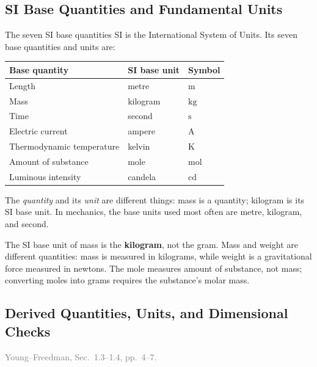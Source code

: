 \documentclass[11pt,letterpaper]{article}
\newcommand{\bookref}[2]{\textcolor{gray}{\footnotesize Young--Freedman, Sec.~#1, pp.~#2.}}
\begin{document}
\subsection{SI Base Quantities and Fundamental Units}
\begin{defbox}{The seven SI base quantities}
SI is the International System of Units. Its seven base quantities and units are:
\begin{center}
\begin{tabular}{lll}
\toprule
\textbf{Base quantity} & \textbf{SI base unit} & \textbf{Symbol}\\
\midrule
Length & metre & $\mathrm{m}$\\
Mass & kilogram & $\mathrm{kg}$\\
Time & second & $\mathrm{s}$\\
Electric current & ampere & $\mathrm{A}$\\
Thermodynamic temperature & kelvin & $\mathrm{K}$\\
Amount of substance & mole & $\mathrm{mol}$\\
Luminous intensity & candela & $\mathrm{cd}$\\
\bottomrule
\end{tabular}
\end{center}
The \emph{quantity} and its \emph{unit} are different things: mass is a quantity; kilogram is its SI base unit. In mechanics, the base units used most often are metre, kilogram, and second.
\end{defbox}

\begin{watchbox}
The SI base unit of mass is the \textbf{kilogram}, not the gram. Mass and weight are different quantities: mass is measured in kilograms, while weight is a gravitational force measured in newtons. The mole measures amount of substance, not mass; converting moles into grams requires the substance's molar mass.
\end{watchbox}

\subsection{Derived Quantities, Units, and Dimensional Checks}
\bookref{1.3--1.4}{4--7}
\end{document}
